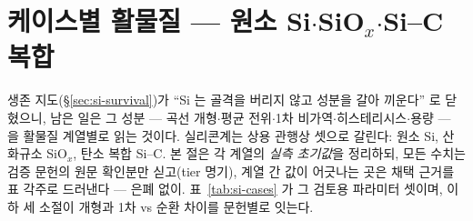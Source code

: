 \section{케이스별 활물질 --- 원소 Si$\cdot$SiO$_x$$\cdot$Si--C 복합}\label{sec:si-cases}
생존 지도(\S\ref{sec:si-survival})가 ``Si 는 골격을 버리지 않고 성분을 갈아 끼운다'' 로 닫혔으니, 남은 일은
그 성분 --- 곡선 개형$\cdot$평균 전위$\cdot$1차 비가역$\cdot$히스테리시스$\cdot$용량 --- 을 활물질 계열별로
읽는 것이다. 실리콘계는 상용 관행상 셋으로 갈린다: 원소 Si, 산화규소 SiO$_x$, 탄소 복합 Si--C. 본 절은 각
계열의 \emph{실측 초기값}을 정리하되, 모든 수치는 검증 문헌의 원문 확인분만 싣고(tier 명기), 계열 간 값이
어긋나는 곳은 채택 근거를 표 각주로 드러낸다 --- 은폐 없이. 표~\ref{tab:si-cases} 가 그 검토용 파라미터
셋이며, 이하 세 소절이 개형과 1차 vs 순환 차이를 문헌별로 잇는다.

